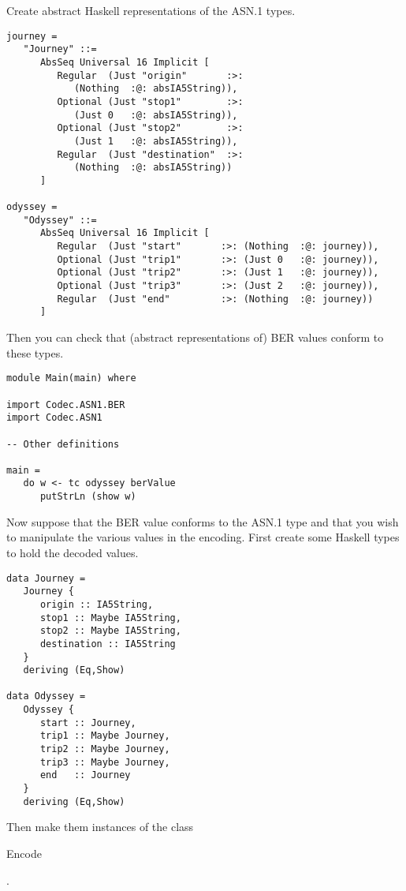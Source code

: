 \documentclass{article}
\begin{document}
Create abstract Haskell representations of the ASN.1 types.

\lstset{language=Haskell}
\begin{lstlisting}[frame=single]
journey =
   "Journey" ::=
      AbsSeq Universal 16 Implicit [
         Regular  (Just "origin"       :>: 
            (Nothing  :@: absIA5String)),
         Optional (Just "stop1"        :>: 
            (Just 0   :@: absIA5String)),
         Optional (Just "stop2"        :>: 
            (Just 1   :@: absIA5String)),
         Regular  (Just "destination"  :>: 
            (Nothing  :@: absIA5String))
      ]

odyssey =
   "Odyssey" ::=
      AbsSeq Universal 16 Implicit [
         Regular  (Just "start"       :>: (Nothing  :@: journey)),
         Optional (Just "trip1"       :>: (Just 0   :@: journey)),
         Optional (Just "trip2"       :>: (Just 1   :@: journey)),
         Optional (Just "trip3"       :>: (Just 2   :@: journey)),
         Regular  (Just "end"         :>: (Nothing  :@: journey))
      ]
\end{lstlisting}

Then you can check that (abstract representations of) BER values conform
to these types.

\begin{lstlisting}[frame=single]
module Main(main) where

import Codec.ASN1.BER
import Codec.ASN1

-- Other definitions

main = 
   do w <- tc odyssey berValue
      putStrLn (show w)
\end{lstlisting}

Now suppose that the BER value conforms to the ASN.1 type and that
you wish to manipulate the various values in the encoding. First
create some Haskell types to hold the decoded values.

\begin{lstlisting}[frame=single]
data Journey =
   Journey {
      origin :: IA5String,
      stop1 :: Maybe IA5String,
      stop2 :: Maybe IA5String,
      destination :: IA5String
   }
   deriving (Eq,Show)

data Odyssey =
   Odyssey {
      start :: Journey,
      trip1 :: Maybe Journey,
      trip2 :: Maybe Journey,
      trip3 :: Maybe Journey,
      end   :: Journey
   }
   deriving (Eq,Show)
\end{lstlisting}

Then make them instances of the class {\begin{tt}Encode\end{tt}}.
\end{document}

